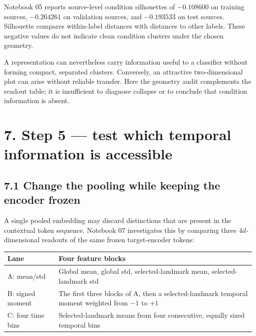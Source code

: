 \documentclass[11pt,letterpaper]{article}
\newcounter{none}
\begin{document}
Notebook 05 reports source-level condition silhouettes of \(-0.108600\)
on training sources, \(-0.264261\) on validation sources, and
\(-0.193533\) on test sources. Silhouette compares within-label
distances with distances to other labels. These negative values do not
indicate clean condition clusters under the chosen geometry.

A representation can nevertheless carry information useful to a
classifier without forming compact, separated clusters. Conversely, an
attractive two-dimensional plot can arise without reliable transfer.
Here the geometry audit complements the readout table; it is
insufficient to diagnose collapse or to conclude that condition
information is absent.

\section{7. Step 5 --- test which temporal information is
accessible}\label{step-5-test-which-temporal-information-is-accessible}

\subsection{7.1 Change the pooling while keeping the encoder
frozen}\label{change-the-pooling-while-keeping-the-encoder-frozen}

A single pooled embedding may discard distinctions that are present in
the contextual token sequence. Notebook 07 investigates this by
comparing three \(4d\)-dimensional readouts of the same frozen
target-encoder tokens:

\begin{minipage}{\linewidth}

{\def\LTcaptype{none} %
\begin{longtable}[]{@{}
  >{\raggedright\arraybackslash}p{}
  >{\raggedright\arraybackslash}p{}@{}}
\toprule\noalign{}
\begin{minipage}[b]{\linewidth}\raggedright
Lane
\end{minipage} & \begin{minipage}[b]{\linewidth}\raggedright
Four feature blocks
\end{minipage} \\
\midrule\noalign{}
\endhead
\bottomrule\noalign{}
\endlastfoot
A: mean/std & Global mean, global std, selected-landmark mean,
selected-landmark std \\
B: signed moment & The first three blocks of A, then a selected-landmark
temporal moment weighted from \(-1\) to \(+1\) \\
C: four time bins & Selected-landmark means from four consecutive,
equally sized temporal bins \\
\end{longtable}
}

\end{minipage}
\end{document}
